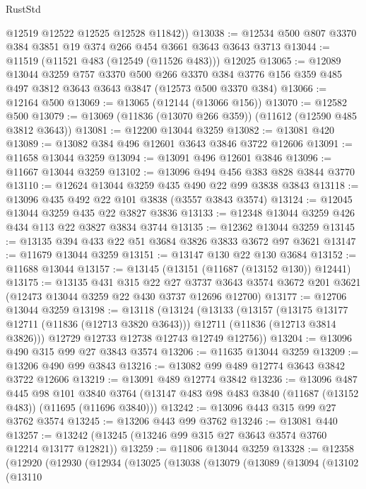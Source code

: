 \begin{lexlean}{RustStd}
\begin{coremodule}
        @12519
        @12522
        @12525
        @12528
        @11842))
@13038 := @12534 @500 @807 @3370 @384 @3851 @19 @374 @266 @454 @3661 @3643 @3643 @3713
@13044 := @11519 (@11521 @483 (@12549 (@11526 @483))) @12025
@13065 := @12089
    @13044
    @3259
    @757
    @3370
    @500
    @266
    @3370
    @384
    @3776
    @156
    @359
    @485
    @497
    @3812
    @3643
    @3643
    @3847
    (@12573 @500 @3370 @384)
@13066 := @12164 @500
@13069 := @13065 (@12144 (@13066 @156))
@13070 := @12582 @500
@13079 := @13069 (@11836 (@13070 @266 @359)) (@11612 (@12590 @485 @3812 @3643))
@13081 := @12200 @13044 @3259
@13082 := @13081 @420
@13089 := @13082 @384 @496 @12601 @3643 @3846 @3722 @12606
@13091 := @11658 @13044 @3259
@13094 := @13091 @496 @12601 @3846
@13096 := @11667 @13044 @3259
@13102 := @13096 @494 @456 @383 @828 @3844 @3770
@13110 := @12624 @13044 @3259 @435 @490 @22 @99 @3838 @3843
@13118 := @13096 @435 @492 @22 @101 @3838 (@3557 @3843 @3574)
@13124 := @12045 @13044 @3259 @435 @22 @3827 @3836
@13133 := @12348 @13044 @3259 @426 @434 @113 @22 @3827 @3834 @3744
@13135 := @12362 @13044 @3259
@13145 := @13135 @394 @433 @22 @51 @3684 @3826 @3833 @3672 @97 @3621
@13147 := @11679 @13044 @3259
@13151 := @13147 @130 @22 @130 @3684
@13152 := @11688 @13044
@13157 := @13145 (@13151 (@11687 (@13152 @130)) @12441)
@13175 := @13135
    @431
    @315
    @22
    @27
    @3737
    @3643
    @3574
    @3672
    @201
    @3621
    (@12473 @13044 @3259 @22 @430 @3737 @12696 @12700)
@13177 := @12706 @13044 @3259
@13198 := @13118
    (@13124
      (@13133
        (@13157
          (@13175 @13177 @12711 (@11836 (@12713 @3820 @3643)))
          @12711
          (@11836 (@12713 @3814 @3826)))
        @12729
        @12733
        @12738
        @12743
        @12749
        @12756))
@13204 := @13096 @490 @315 @99 @27 @3843 @3574
@13206 := @11635 @13044 @3259
@13209 := @13206 @490 @99 @3843
@13216 := @13082 @99 @489 @12774 @3643 @3842 @3722 @12606
@13219 := @13091 @489 @12774 @3842
@13236 := @13096
    @487
    @445
    @98
    @101
    @3840
    @3764
    (@13147 @483 @98 @483 @3840 (@11687 (@13152 @483)) (@11695 (@11696 @3840)))
@13242 := @13096 @443 @315 @99 @27 @3762 @3574
@13245 := @13206 @443 @99 @3762
@13246 := @13081 @440
@13257 := @13242 (@13245 (@13246 @99 @315 @27 @3643 @3574 @3760 @12214 @13177 @12821))
@13259 := @11806 @13044 @3259
@13328 := @12358
    (@12920
      (@12930
        (@12934
          (@13025
            (@13038
              (@13079
                (@13089
                  (@13094
                    (@13102
                      (@13110

\end{coremodule}
\end{lexlean}
